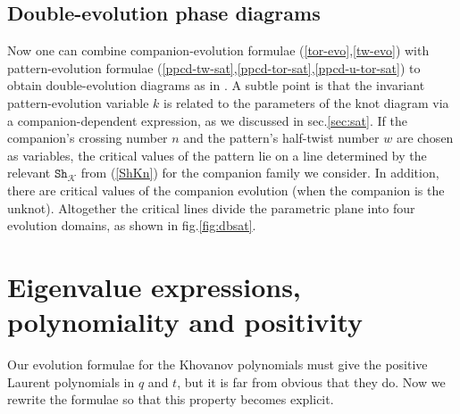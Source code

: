 \documentclass[11pt]{article}
\def\Km{\mathcal{K}}
\def\Sh{\mathtt{Sh}}
\begin{document}
\subsection{Double-evolution phase diagrams}
Now one can combine companion-evolution formulae (\ref{tor-evo},\ref{tw-evo}) with pattern-evolution formulae (\ref{ppcd-tw-sat},\ref{ppcd-tor-sat},\ref{ppcd-u-tor-sat}) to obtain double-evolution diagrams as in \cite{DBPev,APev}. A subtle point is that the invariant pattern-evolution variable $k$ is related to the parameters of the knot diagram via a companion-dependent expression, as we discussed in sec.\ref{sec:sat}. If the companion's crossing number $n$ and the pattern's half-twist number $w$ are chosen as variables, the critical values of the pattern lie on a line determined by the relevant $\Sh_{\Km}$ from (\ref{ShKn}) for the companion family we consider. In addition, there are critical values of the companion evolution (when the companion is the unknot).  Altogether the critical lines divide the parametric plane into four evolution domains, as shown in fig.\ref{fig:dbsat}.


\section{Eigenvalue expressions, polynomiality and positivity\label{sec:pos}}
Our evolution formulae for the Khovanov polynomials must give the positive Laurent polynomials in $q$ and $t$, but it is far from obvious that they do. Now we rewrite the formulae so that this property becomes explicit.
\end{document}
